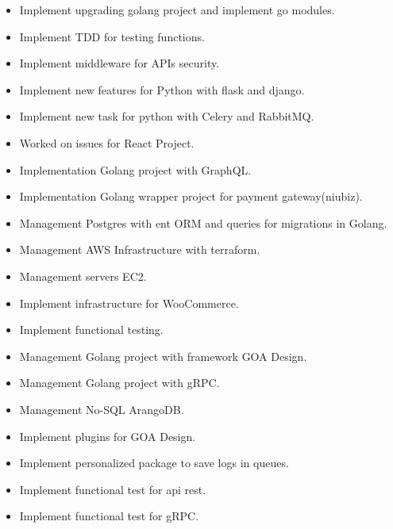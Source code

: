 

\begin{itemize}
    \item Implement upgrading golang project and implement go modules.
    \item Implement TDD for testing functions.
    \item Implement middleware for APIs security.
    \item Implement new features for Python with flask and django.
    \item Implement new task for python with Celery and RabbitMQ.
    \item Worked on issues for React Project.
\end{itemize}

\divider

\begin{itemize}
    \item Implementation Golang project with GraphQL.
    \item Implementation Golang wrapper project for payment gateway(niubiz).
    \item Management Postgres with ent ORM and queries for migrations in Golang.
    \item Management AWS Infrastructure with terraform.
    \item Management servers EC2.
    \item Implement infrastructure for WooCommerce.
    \item Implement functional testing.
\end{itemize}

\divider

\begin{itemize}
    \item Management Golang project with framework GOA Design.
    \item Management Golang project with gRPC.
    \item Management No-SQL ArangoDB.
    \item Implement plugins for GOA Design.
    \item Implement personalized package to save logs in queues.
    \item Implement functional test for api rest.
    \item Implement functional test for gRPC.
\end{itemize}

